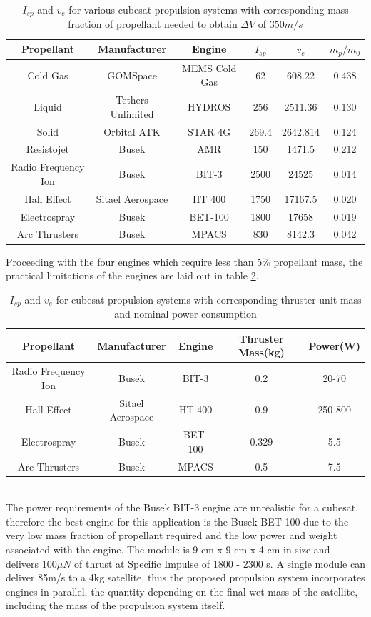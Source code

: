 \begin{table}[h!]
	\centering
	\begin{tabular}{c c c c c c }
		\hline
		Propellant & Manufacturer & Engine & $I_{sp}$ & $v_e$ & $m_p/m_0$ \\
		\hline
		Cold Gas & GOMSpace & MEMS Cold Gas & 62 & 608.22 & 0.438 \\
		Liquid & Tethers Unlimited & HYDROS & 256 & 2511.36 & 0.130 \\
		Solid & Orbital ATK & STAR 4G & 269.4 & 2642.814 & 0.124 \\
		Resistojet & Busek & AMR & 150 & 1471.5 & 0.212 \\
		Radio Frequency Ion & Busek & BIT-3 & 2500 & 24525 & 0.014 \\
		Hall Effect & Sitael Aerospace & HT 400 & 1750 & 17167.5 & 0.020 \\
		Electrospray & Busek & BET-100 & 1800 & 17658 & 0.019 \\
		Arc Thrusters & Busek & MPACS & 830 & 8142.3 & 0.042 \\
		\hline
	\end{tabular}
	\caption{$I_{sp}$ and $v_e$ for various cubesat propulsion systems with corresponding mass fraction of propellant needed to obtain $\Delta V$ of $350 m/s$}
	\label{MMtab1}
\end{table}

Proceeding with the four engines which require less than 5\% propellant mass, the practical limitations of the engines are laid out in table \ref{MMtab2}.
\\
\begin{table}[h!]
	\centering
	\begin{tabular}{c c c c c }
		\hline
		Propellant & Manufacturer & Engine & Thruster Mass(kg) & Power(W) \\
		\hline
		Radio Frequency Ion & Busek & BIT-3 & 0.2 & 20-70 \\
		Hall Effect & Sitael Aerospace & HT 400 & 0.9 & 250-800 \\
		Electrospray & Busek & BET-100 & 0.329 & 5.5 \\
		Arc Thrusters & Busek & MPACS & 0.5 & 7.5 \\
		\hline
	\end{tabular}
	\caption{$I_{sp}$ and $v_e$ for cubesat propulsion systems with corresponding thruster unit mass and nominal power consumption}
	\label{MMtab2}
\end{table}
\\
The power requirements of the Busek BIT-3 engine are unrealistic for a cubesat, therefore the best engine for this application is the Busek BET-100 due to the very low mass fraction of propellant required and the low power and weight associated with the engine. The module is 9 cm x 9 cm x 4 cm in size and delivers 100$\mu N$ of thrust at Specific Impulse of 1800 - 2300 s. A single module can deliver 85m/s to a 4kg satellite, thus the proposed propulsion system incorporates engines in parallel, the quantity depending on the final wet mass of the satellite, including the mass of the propulsion system itself.

